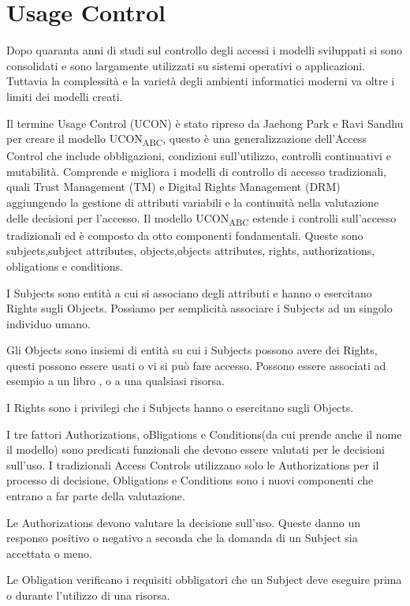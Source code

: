 \section{Usage Control}
\label{sec:Usage Control}
Dopo quaranta anni di studi sul controllo degli accessi i modelli sviluppati si sono consolidati e sono largamente utilizzati
su sistemi operativi o applicazioni. Tuttavia la complessità e la varietà degli ambienti informatici moderni va oltre i limiti
dei modelli creati.\par
Il termine Usage Control (UCON) è stato ripreso da Jaehong Park e Ravi Sandhu per creare il modello UCON\textsubscript{ABC}\cite{ucon},
questo è una generalizzazione dell'Access Control che include obbligazioni, condizioni sull'utilizzo,
controlli continuativi e mutabilità. Comprende e migliora i modelli di controllo di accesso tradizionali, quali Trust
Management (TM) e Digital Rights Management (DRM) aggiungendo la gestione di attributi variabili e la continuità nella valutazione
delle decisioni per l'accesso. Il modello UCON\textsubscript{ABC} estende i controlli sull'accesso tradizionali ed è composto da otto componenti fondamentali.
Queste sono subjects,subject attributes, objects,objects attributes, rights, authorizations, obligations e conditions.\par
{}
I Subjects sono entità a cui si associano degli attributi e hanno o esercitano Rights sugli Objects. Possiamo per semplicità
associare i Subjects ad un singolo individuo umano.\par
Gli Objects sono insiemi di entità su cui i Subjects possono avere dei Rights, questi possono essere usati o vi si può
fare accesso. Possono essere associati ad esempio a un libro , o a una qualsiasi risorsa.\par
I Rights sono i privilegi che i Subjects hanno o esercitano sugli Objects.\par
I tre fattori Authorizations, oBligations e Conditions(da cui prende anche il
nome il modello) sono predicati funzionali che devono essere valutati per le decisioni sull'uso.
I tradizionali Access Controls utilizzano solo le Authorizations per il processo di decisione, Obligations e Conditions
sono i nuovi componenti che entrano a far parte della valutazione.\par
Le Authorizations devono valutare la decisione sull'uso. Queste danno un responso positivo
o negativo a seconda che la domanda di un Subject sia accettata o meno.\par
Le Obligation verificano i requisiti obbligatori che un Subject deve eseguire prima o durante l'utilizzo di una risorsa.\par

